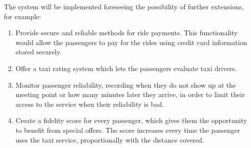 The system will be implemented foreseeing the possibility of further extensions, for example:

\begin{enumerate}
    \item Provide secure and reliable methods for ride payments. This functionality would allow the passengers to pay for the rides using credit card information stored securely.
    \item Offer a taxi rating system which lets the passengers evaluate taxi drivers.
    \item Monitor passenger reliability, recording when they do not show up at the meeting point or how many minutes later they arrive, in order to limit their access to the service when their reliability is bad.
    \item Create a fidelity score for every passenger, which gives them the opportunity to benefit from special offers. The score increases every time the passenger uses the taxi service, proportionally with the distance covered.
\end{enumerate}

